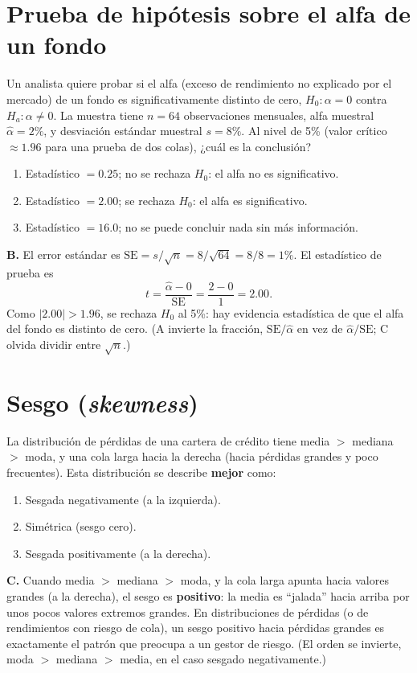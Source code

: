 \documentclass[11pt,a4paper,oneside]{article}
\theoremstyle{definition}
\begin{document}
\section{Prueba de hipótesis sobre el alfa de un fondo}

\begin{cfaBox}
Un analista quiere probar si el alfa (exceso de rendimiento no explicado
por el mercado) de un fondo es significativamente distinto de cero,
$H_0:\alpha=0$ contra $H_a:\alpha\ne0$. La muestra tiene $n=64$
observaciones mensuales, alfa muestral $\hat\alpha=2\%$, y desviación
estándar muestral $s=8\%$. Al nivel de 5\% (valor crítico
$\approx1.96$ para una prueba de dos colas), ¿cuál es la conclusión?
\begin{enumerate}[label=\Alph*.]
\item Estadístico $=0.25$; no se rechaza $H_0$: el alfa no es significativo.
\item Estadístico $=2.00$; se rechaza $H_0$: el alfa es significativo.
\item Estadístico $=16.0$; no se puede concluir nada sin más información.
\end{enumerate}
\end{cfaBox}
\begin{solBox}
\textbf{B.} El error estándar es $\mathrm{SE}=s/\sqrt n=8/\sqrt{64}=8/8=1\%$.
El estadístico de prueba es
\[
t=\frac{\hat\alpha-0}{\mathrm{SE}}=\frac{2-0}{1}=2.00.
\]
Como $|2.00|>1.96$, se rechaza $H_0$ al 5\%: hay evidencia estadística de
que el alfa del fondo es distinto de cero. (A invierte la fracción,
$\mathrm{SE}/\hat\alpha$ en vez de $\hat\alpha/\mathrm{SE}$; C olvida
dividir entre $\sqrt n$.)
\end{solBox}

\section{Sesgo (\emph{skewness})}

\begin{cfaBox}
La distribución de pérdidas de una cartera de crédito tiene
media $>$ mediana $>$ moda, y una cola larga hacia la derecha (hacia
pérdidas grandes y poco frecuentes). Esta distribución se describe
\textbf{mejor} como:
\begin{enumerate}[label=\Alph*.]
\item Sesgada negativamente (a la izquierda).
\item Simétrica (sesgo cero).
\item Sesgada positivamente (a la derecha).
\end{enumerate}
\end{cfaBox}
\begin{solBox}
\textbf{C.} Cuando media $>$ mediana $>$ moda, y la cola larga apunta hacia
valores grandes (a la derecha), el sesgo es \textbf{positivo}: la media es
``jalada'' hacia arriba por unos pocos valores extremos grandes. En
distribuciones de pérdidas (o de rendimientos con riesgo de cola), un sesgo
positivo hacia pérdidas grandes es exactamente el patrón que preocupa a un
gestor de riesgo. (El orden se invierte, moda $>$ mediana $>$ media, en el
caso sesgado negativamente.)
\end{solBox}
\end{document}
